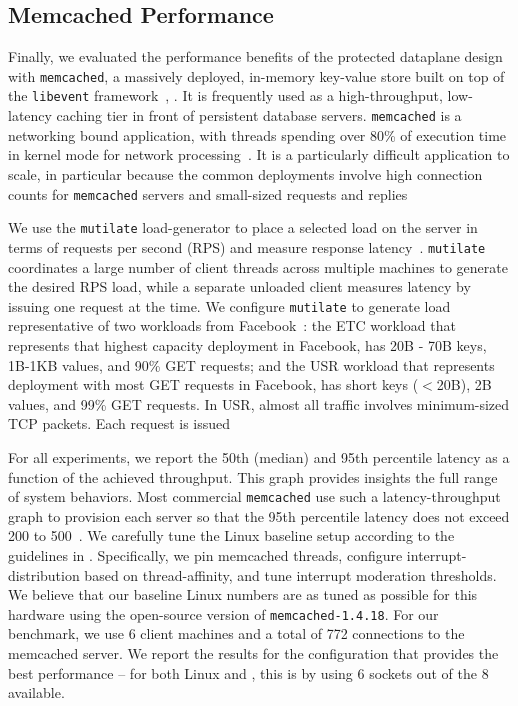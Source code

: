 
\subsection{Memcached Performance}
\label{sec:eval:memcached}




Finally, we evaluated the performance benefits of the \ix protected
dataplane design with \texttt{memcached}, a massively deployed,
in-memory key-value store built on top of the \texttt{libevent}
framework~\cite{url:memcached}, . It is frequently used as a
high-throughput, low-latency caching tier in front of persistent
database servers. \texttt{memcached} is a networking bound
application, with threads spending over 80\% of execution time in
kernel mode for network processing~\cite{Leverich:RHSU:2014}. It is a
particularly difficult application to scale, in particular because the
common deployments involve high connection counts for
\texttt{memcached} servers and small-sized requests and
replies~\cite{nishtala2013scaling,Atikoglu:2012:WAL}

We use the \texttt{mutilate} load-generator to place a selected load
on the server in terms of requests per second (RPS) and measure
response latency~\cite{url:mutilate}. \texttt{mutilate} coordinates a
large number of client threads across multiple machines to generate
the desired RPS load, while a separate unloaded client measures
latency by issuing one request at the time.  We configure
\texttt{mutilate} to generate load representative of two workloads
from Facebook~\cite{Atikoglu:2012:WAL}: the ETC workload that
represents that highest capacity deployment in Facebook, has 20B - 70B
keys, 1B-1KB values, and 90\% GET requests; and the USR workload that
represents deployment with most GET requests in Facebook, has short
keys ($<$20B), 2B values, and 99\% GET requests. In USR, almost all
traffic involves minimum-sized TCP packets. Each request is issued 

For all experiments, we report the 50th (median) and 95th percentile
latency as a function of the achieved throughput. This graph provides
insights the full range of system behaviors. Most commercial
\texttt{memcached} use such a latency-throughput graph to provision
each server so that the 95th percentile latency does not exceed 200 to
500\microsecond~\cite{DBLP:journals/cacm/DeanB13}.  We carefully tune
the Linux baseline setup according to the guidelines in
\cite{Leverich:RHSU:2014}. Specifically, we pin memcached threads,
configure interrupt-distribution based on thread-affinity, and tune
interrupt moderation thresholds. We believe that our baseline Linux
numbers are as tuned as possible for this hardware using the
open-source version of \texttt{memcached-1.4.18}. For our benchmark,
we use 6 client machines and a total of 772 connections to the
memcached server. We report the results for the configuration that
provides the best performance -- for both Linux and \ix, this is by
using 6 sockets out of the 8 available.

